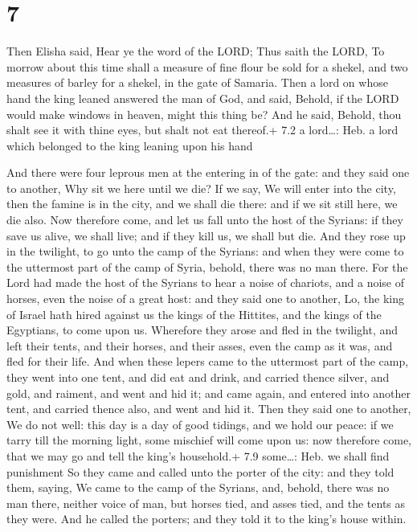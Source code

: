 \hypertarget{section-6}{%
\section{7}\label{section-6}}

 Then Elisha said, Hear ye the word of the LORD; Thus saith
the LORD, To morrow about this time shall a measure of fine flour be
sold for a shekel, and two measures of barley for a shekel, in the gate
of Samaria.  Then a lord on whose hand the king leaned
answered the man of God, and said, Behold, if the LORD would make
windows in heaven, might this thing be? And he said, Behold, thou shalt
see it with thine eyes, but shalt not eat thereof.+ 7.2 a lord\ldots:
Heb. a lord which belonged to the king leaning upon his hand

 And there were four leprous men at the entering in of the
gate: and they said one to another, Why sit we here until we die?
 If we say, We will enter into the city, then the famine is
in the city, and we shall die there: and if we sit still here, we die
also. Now therefore come, and let us fall unto the host of the Syrians:
if they save us alive, we shall live; and if they kill us, we shall but
die.  And they rose up in the twilight, to go unto the camp
of the Syrians: and when they were come to the uttermost part of the
camp of Syria, behold, there was no man there.  For the Lord
had made the host of the Syrians to hear a noise of chariots, and a
noise of horses, even the noise of a great host: and they said one to
another, Lo, the king of Israel hath hired against us the kings of the
Hittites, and the kings of the Egyptians, to come upon us. 
Wherefore they arose and fled in the twilight, and left their tents, and
their horses, and their asses, even the camp as it was, and fled for
their life.  And when these lepers came to the uttermost
part of the camp, they went into one tent, and did eat and drink, and
carried thence silver, and gold, and raiment, and went and hid it; and
came again, and entered into another tent, and carried thence also, and
went and hid it.  Then they said one to another, We do not
well: this day is a day of good tidings, and we hold our peace: if we
tarry till the morning light, some mischief will come upon us: now
therefore come, that we may go and tell the king's household.+ 7.9
some\ldots: Heb. we shall find punishment  So they came and
called unto the porter of the city: and they told them, saying, We came
to the camp of the Syrians, and, behold, there was no man there, neither
voice of man, but horses tied, and asses tied, and the tents as they
were.  And he called the porters; and they told it to the
king's house within.

